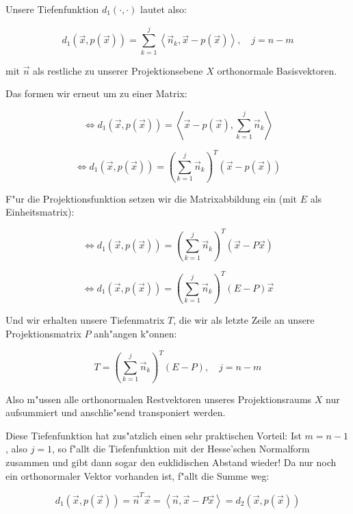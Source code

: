 \documentclass{article}
\newcommand{\lrangle}[1]{\left\langle #1 \right\rangle}
\begin{document}
Unsere Tiefenfunktion \(d_1(\cdot,\cdot)\) lautet also:

	\begin{equation}
		d_1(\vec{x}, p(\vec{x})) = \sum_{k=1}^{j}{\lrangle{ \vec{n}_k, \vec{x} - p(\vec{x}) }},
		\quad j = n -m
	\end{equation}

mit \(\vec{n}\) als restliche zu unserer Projektionsebene \(X\) orthonormale Basisvektoren.

Das formen wir erneut um zu einer Matrix:

	\begin{equation}
		\iff d_1(\vec{x}, p(\vec{x})) = \lrangle{ \vec{x} - p(\vec{x}), \sum_{k=1}^{j}{\vec{n}_k} }
	\end{equation}

	\begin{equation}
		\iff d_1(\vec{x}, p(\vec{x})) = (\sum_{k=1}^{j}{\vec{n}_k})^T (\vec{x} - p(\vec{x}))
	\end{equation}

F"ur die Projektionsfunktion setzen wir die Matrixabbildung ein (mit \(E\) als Einheitsmatrix):

	\begin{equation}
		\iff d_1(\vec{x}, p(\vec{x})) = (\sum_{k=1}^{j}{\vec{n}_k})^T (\vec{x} - P\vec{x})
	\end{equation}

	\begin{equation}
		\iff d_1(\vec{x}, p(\vec{x})) = (\sum_{k=1}^{j}{\vec{n}_k})^T (E - P) \vec{x}
	\end{equation}

Und wir erhalten unsere Tiefenmatrix \(T\), die wir als letzte Zeile an unsere Projektionsmatrix
\(P\) anh"angen k"onnen:

	\begin{equation}
		T = (\sum_{k=1}^{j}{\vec{n}_k})^T (E-P), \quad j = n - m
	\end{equation}

Also m"ussen alle orthonormalen Restvektoren unseres Projektionsraums \(X\) nur aufsummiert und
anschlie"send transponiert werden.

Diese Tiefenfunktion hat zus"atzlich einen sehr praktischen Vorteil: Ist \(m = n - 1\), also
\(j = 1\), so f"allt die Tiefenfunktion mit der Hesse'schen Normalform zusammen und gibt dann sogar
den euklidischen Abstand wieder!
Da nur noch ein orthonormaler Vektor vorhanden ist, f"allt die Summe weg:

	\begin{equation}
		d_1(\vec{x}, p(\vec{x})) = \vec{n}^T \vec{x} = \lrangle{ \vec{n}, \vec{x} - P\vec{x}} =
		d_2(\vec{x}, p(\vec{x}))
	\end{equation}
\end{document}
